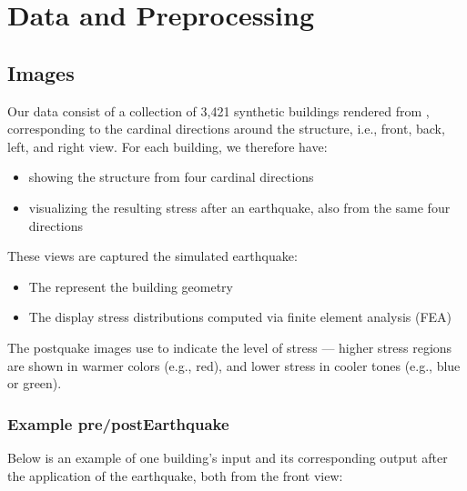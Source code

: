 \documentclass[letterpaper,10pt,english]{sphinxmanual}
\begin{document}
\sphinxstepscope


\chapter{Data and Preprocessing}
\label{\detokenize{data:data-and-preprocessing}}\label{\detokenize{data:data-section}}\label{\detokenize{data::doc}}

\section{Images}
\label{\detokenize{data:images}}
\sphinxAtStartPar
Our data  consist of a collection of 3,421 synthetic buildings
rendered from , corresponding to the cardinal directions
around the structure, i.e., front, back, left, and right view.
For each building, we therefore have:
\begin{itemize}
\item {} 
\sphinxAtStartPar
{} showing the structure from four cardinal directions

\item {} 
\sphinxAtStartPar
{} visualizing the resulting stress after an earthquake, also from the same four directions

\end{itemize}

\sphinxAtStartPar
These views are captured  the simulated earthquake:
\begin{itemize}
\item {} 
\sphinxAtStartPar
The  represent the building geometry

\item {} 
\sphinxAtStartPar
The  display stress distributions computed via finite element analysis (FEA)

\end{itemize}

\sphinxAtStartPar
The post\sphinxhyphen{}quake images use  to indicate the level of
stress — higher stress regions are shown in warmer colors (e.g., red), and
lower stress in cooler tones (e.g., blue or green).


\subsection{Example pre\sphinxhyphen{}/post\sphinxhyphen{}Earthquake}
\label{\detokenize{data:example-pre-post-earthquake}}
\sphinxAtStartPar
Below is an example of one building’s input and its corresponding output after
the application of the earthquake, both from the front view:
\end{document}
